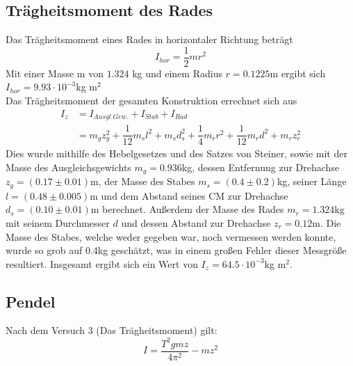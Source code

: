 \documentclass[12pt,a4paper,titlepage,headinclude,bibtotoc]{scrartcl}
\begin{document}
\subsection{Trägheitsmoment des Rades}
Das Trägheitsmoment eines Rades in horizontaler Richtung beträgt $$I_{hor}=\dfrac{1}{2}mr^2$$
Mit einer Masse m von $1.324$ kg und einem Radius $r=0.1225$m ergibt sich $I_{hor}=9.93\cdot 10^{-3}$kg m$^2$\\
Das Trägheitsmoment der gesamten Konstruktion errechnet sich aus
\begin{align*}
I_z&=I_{Ausgl.Gew.}+I_{Stab}+I_{Rad}\\
&= m_gz_g^2+\dfrac{1}{12}m_sl^2+m_sd_s^2+\dfrac{1}{4}m_rr^2+\dfrac{1}{12}m_rd^2+m_rz_r^2
\end{align*}
Dies wurde mithilfe des Hebelgesetzes und des Satzes von Steiner, sowie mit der Masse des Ausgleichsgewichts $m_g=0.936$kg, dessen Entfernung zur Drehachse $z_g=(0.17\pm 0.01)$m, der Masse des Stabes $m_s=(0.4\pm 0.2)$kg, seiner Länge $l=(0.48\pm 0.005)$m und dem Abstand seines CM zur Drehachse $d_s=(0.10\pm 0.01)$m berechnet. Außerdem der Masse des Rades $m_r=1.324$kg mit seinem Durchmesser $d$ und dessen Abstand zur Drehachse $z_r=0.12$m. Die Masse des Stabes, welche weder gegeben war, noch vermessen werden konnte, wurde so grob auf $0.4$kg geschätzt, was in einem großen Fehler dieser Messgröße resultiert.
Insgesamt ergibt sich ein Wert von $I_z=64.5\cdot 10^{-3}$kg m$^2$.


\subsection{Pendel}
Nach dem Versuch 3 (Das Trägheitsmoment) gilt: $$I=\dfrac{T^2gmz}{4\pi^2}-mz^2$$
\end{document}
